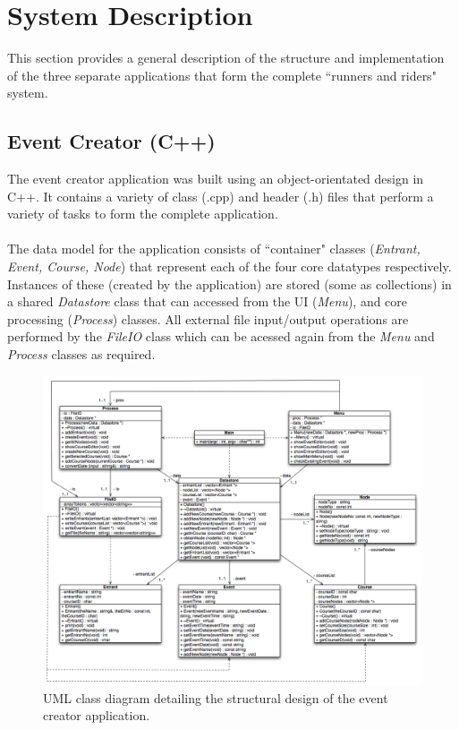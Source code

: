 \documentclass[a4paper, 10pt]{article}
\begin{document}


\clearpage
\section{System Description}

This section provides a general description of the structure and implementation of the three separate applications that form the complete ``runners and riders" system.

\subsection{Event Creator (C++)}

The event creator application was built using an object-orientated design in C++. It contains a variety of class (.cpp) and header (.h) files that perform a variety of tasks to form the complete application.\\\\
The data model for the application consists of ``container" classes (\textit{Entrant, Event, Course, Node}) that represent each of the four core datatypes respectively. Instances of these (created by the application) are stored (some as collections) in a shared \textit{Datastore} class that can accessed from the UI (\textit{Menu}), and core processing (\textit{Process}) classes. All external file input/output operations are performed by the \textit{FileIO} class which can be acessed again from the \textit{Menu} and \textit{Process} classes as required. 

\begin{figure}[ht!]
\centering
\includegraphics[scale=0.4]{event_creator_class_diagram.jpg}
\caption{UML class diagram detailing the structural design of the event creator application.}
\end{figure}
\end{document}
